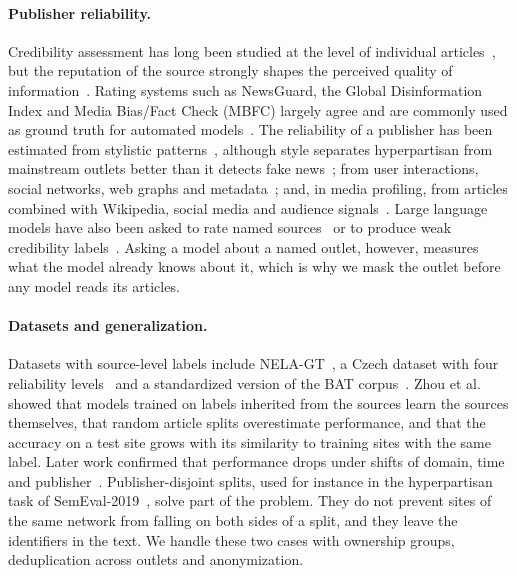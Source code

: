 \documentclass[11pt,a4paper]{article}
\begin{document}
\paragraph{Publisher reliability.} Credibility assessment has long been studied at the level of individual
articles~\cite{pandolfi2020automatic,10.1145/3770077}, but the reputation of the source strongly shapes the perceived
quality of information~\cite{doi:10.1080/07421222.2019.1628921}. Rating systems such as NewsGuard, the Global
Disinformation Index and Media Bias/Fact Check (MBFC) largely agree and are commonly used as ground truth for automated
models~\cite{lin2023high,DBLP:conf/icwsm/PratelliP22}. The reliability of a publisher has been estimated from stylistic
patterns~\cite{przybyla2020capturing}, although style separates hyperpartisan from mainstream outlets better than it
detects fake news~\cite{potthast2018stylometric}; from user interactions, social networks, web graphs and
metadata~\cite{bazmi2023multi,DBLP:conf/ecir/PratelliSP25,DBLP:conf/icwsm/WilliamsCC25,DBLP:journals/jdiq/LongoZCZC25};
and, in media profiling, from articles combined with Wikipedia, social media and audience
signals~\cite{baly2018predicting,baly2020written,nakov2024survey}. Large language models have also been asked to rate
named sources~\cite{yang2023large} or to produce weak credibility labels~\cite{Leite2025}. Asking a model about a named
outlet, however, measures what the model already knows about it, which is why we mask the outlet before any model reads
its articles.

\paragraph{Datasets and generalization.} Datasets with source-level labels include NELA-GT~\cite{gruppi2021nela}, a
Czech dataset with four reliability levels~\cite{bohavcek2022fine} and a standardized version of the BAT
corpus~\cite{DBLP:journals/dbsk/AdjiLS26,batDataset}. Zhou et al.~\cite{zhou2021hidden} showed that models trained on
labels inherited from the sources learn the sources themselves, that random article splits overestimate performance, and
that the accuracy on a test site grows with its similarity to training sites with the same label. Later work confirmed
that performance drops under shifts of domain, time and
publisher~\cite{azizov-etal-2024-safari,burdisso-etal-2024-reliability,verhoeven2025yesterday}. Publisher-disjoint
splits, used for instance in the hyperpartisan task of SemEval-2019~\cite{kiesel2019semeval}, solve part of the problem.
They do not prevent sites of the same network from falling on both sides of a split, and they leave the identifiers in
the text. We handle these two cases with ownership groups, deduplication across outlets and anonymization.
\end{document}
